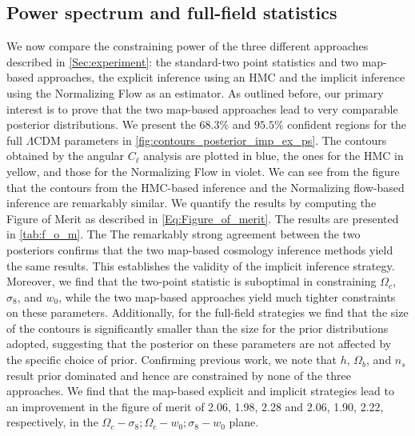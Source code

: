 \documentclass{aa}
\begin{document}
\subsection{Power spectrum and full-field statistics}
We now compare the constraining power of the three different approaches described in \autoref{Sec:experiment}: the standard-two point statistics and two map-based approaches, the explicit inference using an HMC and the implicit inference using the Normalizing Flow as an estimator. 
As outlined before, our primary interest is to prove that the two map-based approaches lead to very comparable posterior distributions. We present the $68.3\%$ and $95.5\%$ confident regions for the full $\Lambda$CDM parameters in \autoref{fig:contours_posterior_imp_ex_ps}. The contours obtained by the angular $C_{\ell}$ analysis are plotted in blue, the ones for the HMC in yellow, and those for the Normalizing Flow in violet. 
We can see from the figure that the contours from the HMC-based inference and the Normalizing flow-based inference are remarkably similar.  We quantify the results by computing the Figure of Merit as described in \autoref{Eq:Figure_of_merit}. The results are presented in \autoref{tab:f_o_m}. The
The remarkably strong agreement between the two posteriors confirms that the two map-based cosmology inference methods yield the same results. This establishes the validity of the implicit inference strategy.
Moreover, we find that the two-point statistic is suboptimal in constraining $\Omega_c$, $\sigma_8$, and $w_0$, while the two map-based approaches yield much tighter constraints on these parameters. Additionally, for the full-field strategies we find that the size of the contours is significantly smaller than the size for the prior distributions adopted, suggesting that the 
posterior on these parameters are not affected by the specific choice of prior.
Confirming previous work, we note that $h$, $\Omega_b$, and $n_s$ result prior dominated and hence are constrained by none of the three approaches. 
We find that the map-based explicit and implicit strategies lead to an improvement in the figure of merit of 2.06, 1.98, 2.28 and 2.06, 1.90, 2.22, respectively, in the $\Omega_c-\sigma_8; \Omega_c-w_0; \sigma_8-w_0$ plane.
\end{document}
